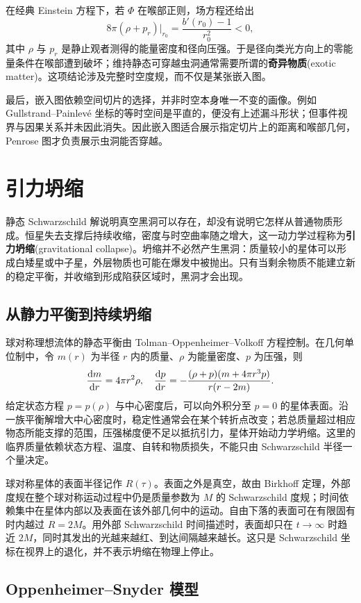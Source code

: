 在经典 Einstein 方程下，若 $\Phi$ 在喉部正则，场方程还给出
\[
    8\pi(\rho+p_r)\big|_{r_0}=\frac{b'(r_0)-1}{r_0^2}<0,
\]
其中 $\rho$ 与 $p_r$ 是静止观者测得的能量密度和径向压强。于是径向类光方向上的零能量条件在喉部遭到破坏；维持静态可穿越虫洞通常需要所谓的\textbf{奇异物质}(exotic matter)。这项结论涉及完整时空度规，而不仅是某张嵌入图。

最后，嵌入图依赖空间切片的选择，并非时空本身唯一不变的画像。例如 Gullstrand--Painlevé 坐标的等时空间是平直的，便没有上述漏斗形状；但事件视界与因果关系并未因此消失。因此嵌入图适合展示指定切片上的距离和喉部几何，Penrose 图才负责展示虫洞能否穿越。


\section{引力坍缩}

静态 Schwarzschild 解说明真空黑洞可以存在，却没有说明它怎样从普通物质形成。恒星失去支撑后持续收缩，密度与时空曲率随之增大，这一动力学过程称为\textbf{引力坍缩}(gravitational collapse)。坍缩并不必然产生黑洞：质量较小的星体可以形成白矮星或中子星，外层物质也可能在爆发中被抛出。只有当剩余物质不能建立新的稳定平衡，并收缩到形成陷获区域时，黑洞才会出现。

\subsection{从静力平衡到持续坍缩}

球对称理想流体的静态平衡由 Tolman--Oppenheimer--Volkoff 方程控制。在几何单位制中，令 $m(r)$ 为半径 $r$ 内的质量、$\rho$ 为能量密度、$p$ 为压强，则
\[
    \dv{m}{r}=4\pi r^2\rho,\quad
    \dv{p}{r}=-\frac{(\rho+p)(m+4\pi r^3p)}{r(r-2m)}.
\]
给定状态方程 $p=p(\rho)$ 与中心密度后，可以向外积分至 $p=0$ 的星体表面。沿一族平衡解增大中心密度时，稳定性通常会在某个转折点改变；若总质量超过相应物态所能支撑的范围，压强梯度便不足以抵抗引力，星体开始动力学坍缩。这里的临界质量依赖状态方程、温度、自转和物质损失，不能只由 Schwarzschild 半径一个量决定。

球对称星体的表面半径记作 $R(\tau)$。表面之外是真空，故由 Birkhoff 定理，外部度规在整个球对称运动过程中仍是质量参数为 $M$ 的 Schwarzschild 度规；时间依赖集中在星体内部以及表面在该外部几何中的运动。自由下落的表面可在有限固有时内越过 $R=2M$。用外部 Schwarzschild 时间描述时，表面却只在 $t\to\infty$ 时趋近 $2M$，同时其发出的光越来越红、到达间隔越来越长。这只是 Schwarzschild 坐标在视界上的退化，并不表示坍缩在物理上停止。

\subsection{Oppenheimer--Snyder 模型}

